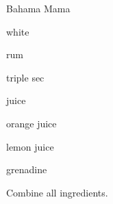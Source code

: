 \begin{recipe}{Bahama Mama}{}{}

\begin{ingredients}
\item {} white 
\item \C{\threequarter}  rum
\item \C{\quarter} triple sec
\item {}  juice
\item {} orange juice
\item \C{\quarter} lemon juice
\item \C{\quarter} grenadine
\end{ingredients}

\begin{directions}
\item Combine all ingredients.
\end{directions}

\end{recipe}
